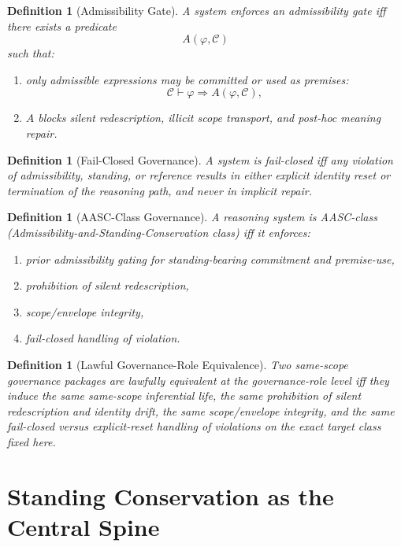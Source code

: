 \documentclass[11pt]{article}
\newtheorem{definition}[theorem]{Definition}
\begin{document}
\begin{definition}[Admissibility Gate]
\label{def:gate}
A system enforces an \emph{admissibility gate} iff there exists a predicate
\[
A(\varphi,\mathcal{C})
\]
such that:
\begin{enumerate}
\item only admissible expressions may be committed or used as premises:
\[
\mathcal{C}\vdash \varphi \Rightarrow A(\varphi,\mathcal{C}),
\]
\item $A$ blocks silent redescription, illicit scope transport, and post-hoc meaning repair.
\end{enumerate}
\end{definition}

\begin{definition}[Fail-Closed Governance]
\label{def:failclosed}
A system is \emph{fail-closed} iff any violation of admissibility, standing, or reference results in either explicit identity reset or termination of the reasoning path, and never in implicit repair.
\end{definition}

\begin{definition}[AASC-Class Governance]
\label{def:aasc}
A reasoning system is \emph{AASC-class} (\emph{Admissibility-and-Standing-Conservation class}) iff it enforces:
\begin{enumerate}
\item prior admissibility gating for standing-bearing commitment and premise-use,
\item prohibition of silent redescription,
\item scope/envelope integrity,
\item fail-closed handling of violation.
\end{enumerate}
\end{definition}

\begin{definition}[Lawful Governance-Role Equivalence]
\label{def:lawfulequiv}
Two same-scope governance packages are \emph{lawfully equivalent at the governance-role level} iff they induce the same same-scope inferential life, the same prohibition of silent redescription and identity drift, the same scope/envelope integrity, and the same fail-closed versus explicit-reset handling of violations on the exact target class fixed here.
\end{definition}

\section{Standing Conservation as the Central Spine}
\end{document}
